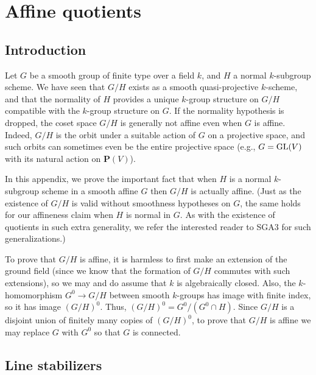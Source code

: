 \documentclass[10pt]{article}
\renewcommand{\(}{\left(}
\renewcommand{\)}{\right)}
\numberwithin{thm}{subsection}
\begin{document}
\section{Affine quotients}\label{affineqt}

\medskip\noindent

\subsection{Introduction}
Let $G$ be a smooth group of finite type over a field $k$, and $H$ a normal $k$-subgroup scheme.
We have seen that $G/H$ exists as a smooth quasi-projective $k$-scheme, and that the normality
of $H$ provides a unique $k$-group structure on $G/H$ compatible with the $k$-group structure
on $G$.  If the normality hypothesis is dropped, the coset space $G/H$ is generally not affine
even when $G$ is affine.  Indeed, $G/H$ is the orbit under a suitable
action of $G$ on a projective space, and such orbits can sometimes even be the entire
projective space (e.g., $G = {\rm{GL}}(V)$ with its natural action on $\mathbf{P}(V)$). 

In this appendix, we prove the important fact that when $H$ is a normal $k$-subgroup scheme in 
a smooth affine $G$
then $G/H$ is actually affine.  (Just as the existence of $G/H$ is valid without smoothness
hypotheses on $G$, the same holds for our affineness claim when $H$ is normal in $G$.  As
with the existence of quotients in such extra generality, we refer the interested reader to SGA3 for such
generalizations.) 

 To prove that $G/H$ is affine, it is harmless to first make
an extension of the ground field (since we know that the formation of $G/H$ commutes with
such extensions), so we may and do assume that $k$ is algebraically closed.
Also, the $k$-homomorphism $G^0 \rightarrow G/H$ between smooth $k$-groups has image
with finite index, so it has image $(G/H)^0$.  Thus, $(G/H)^0 = G^0/(G^0 \cap H)$. 
Since $G/H$ is a disjoint union of finitely many copies of $(G/H)^0$, to prove that
$G/H$ is affine we may replace $G$ with $G^0$ so that $G$ is connected.  

\subsection{Line stabilizers}
\end{document}
